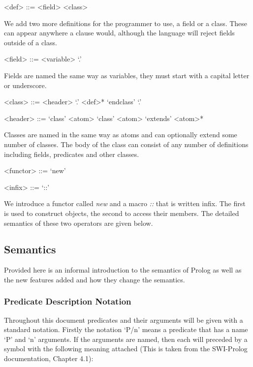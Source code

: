 \documentclass[12pt,a4paper,twoside,openright]{report}
\begin{document}
\begin{grammar}
<def> ::= <field>
\alt <class>
\end{grammar}

We add two more definitions for the programmer to use, a field or a class. These can appear anywhere a clause would, although the language will reject fields outside of a class.

\begin{grammar}
<field> ::= <variable> `.'
\end{grammar}

Fields are named the same way as variables, they must start with a capital letter or underscore.

\begin{grammar}
<class> ::= <header> `.' <def>* `endclass' `.'

<header> ::= `class' <atom>
\alt `class' <atom> `extends' <atom>*
\end{grammar}

Classes are named in the same way as atoms and can optionally extend some number of classes. The body of the class can consist of any number of definitions including fields, predicates and other classes. 

\begin{grammar}
<functor> ::= `new'

<infix> ::= `::'
\end{grammar}

We introduce a functor called \emph{new} and a macro \emph{::} that is written infix. The first is used to construct objects, the second to access their members. The detailed semantics of these two operators are given below.

\subsection {Semantics}

Provided here is an informal introduction to the semantics of Prolog as well as the new features added and how they change the semantics.

\subsubsection {Predicate Description Notation}

Throughout this document predicates and their arguments will be given with a standard notation. Firstly the notation `P/n' means a predicate that has a name `P' and `n' arguments. If the arguments are named, then each will preceded by a symbol with the following meaning attached (This is taken from the SWI-Prolog documentation\cite{SWIDOC}, Chapter 4.1):
\end{document}
